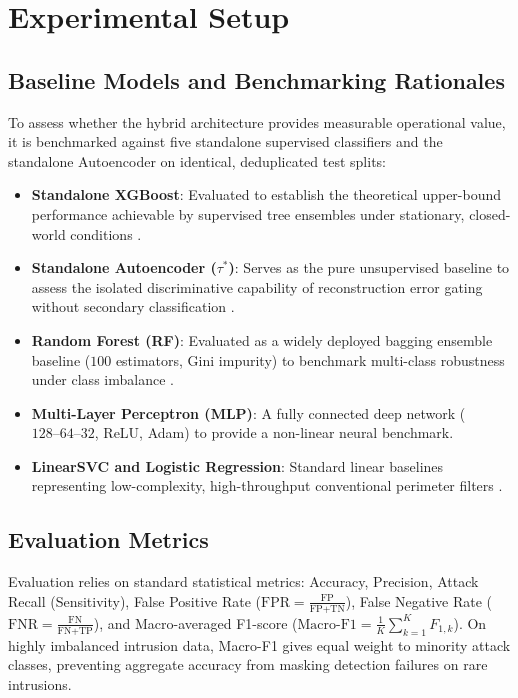\documentclass[journal]{IEEEtran}
\begin{document}
\section{Experimental Setup}

\subsection{Baseline Models and Benchmarking Rationales}
To assess whether the hybrid architecture provides measurable operational value, it is benchmarked against five standalone supervised classifiers and the standalone Autoencoder on identical, deduplicated test splits:
\begin{itemize}
\item \textbf{Standalone XGBoost}: Evaluated to establish the theoretical upper-bound performance achievable by supervised tree ensembles under stationary, closed-world conditions \cite{abdulganiyu2024}.
\item \textbf{Standalone Autoencoder ($\tau^*$)}: Serves as the pure unsupervised baseline to assess the isolated discriminative capability of reconstruction error gating without secondary classification \cite{hussein2026}.
\item \textbf{Random Forest (RF)}: Evaluated as a widely deployed bagging ensemble baseline ($100$ estimators, Gini impurity) to benchmark multi-class robustness under class imbalance \cite{arcos2025}.
\item \textbf{Multi-Layer Perceptron (MLP)}: A fully connected deep network ($128\text{--}64\text{--}32$, ReLU, Adam) to provide a non-linear neural benchmark.
\item \textbf{LinearSVC and Logistic Regression}: Standard linear baselines representing low-complexity, high-throughput conventional perimeter filters \cite{arcos2025}.
\end{itemize}

\subsection{Evaluation Metrics}
Evaluation relies on standard statistical metrics: Accuracy, Precision, Attack Recall (Sensitivity), False Positive Rate ($\text{FPR} = \frac{\text{FP}}{\text{FP}+\text{TN}}$), False Negative Rate ($\text{FNR} = \frac{\text{FN}}{\text{FN}+\text{TP}}$), and Macro-averaged F1-score ($\text{Macro-F1} = \frac{1}{K}\sum_{k=1}^K F_{1,k}$). On highly imbalanced intrusion data, Macro-F1 gives equal weight to minority attack classes, preventing aggregate accuracy from masking detection failures on rare intrusions.
\end{document}
